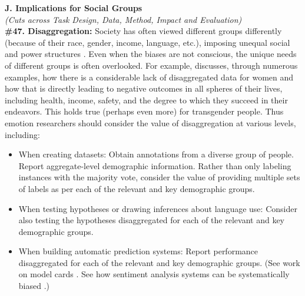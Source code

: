 \documentclass{clv3}
\begin{document}
\noindent \textbf{J. Implications for Social Groups}\\[2pt]
\noindent \textit{(Cuts across Task Design, Data, Method, Impact and Evaluation)}\\


\noindent \textbf{\#47. Disaggregation:} Society has often viewed different groups differently (because of their race, gender, income, language, etc.), imposing unequal social and power structures \cite{lindsey2015sociology}. Even when the biases are not conscious, the unique needs of different groups is often overlooked. For example, \citet{perez2019invisible} discusses, through numerous examples, how there is a considerable lack of disaggregated data for women and how that is directly leading to negative outcomes in all spheres of their lives, including health, income, safety, and the degree to which they succeed in their endeavors. This holds true (perhaps even more) for transgender people. Thus emotion researchers should consider the value of disaggregation at various levels, including:\\[-20pt]
\begin{itemize}
    \item When creating datasets: Obtain annotations from a diverse group of people. Report aggregate-level demographic information. Rather than only labeling instances with the majority vote, consider the value of providing multiple sets of labels as per each of the relevant and key demographic groups.
\vspace*{-1mm}
    \item When testing hypotheses or drawing inferences about language use: Consider also testing the hypotheses disaggregated for each of the relevant and key demographic groups.
\vspace*{-1mm}
    \item When building automatic prediction systems: Report performance disaggregated for each of the relevant and key demographic groups. (See work on model cards \citet{mitchell2019model}. See how sentiment analysis systems can be systematically biased \cite{kiritchenko-mohammad-2018-examining}.)\\
\end{itemize}
\vspace*{-3mm}
\end{document}
